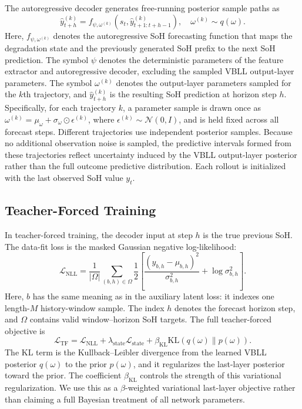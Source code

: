\documentclass[conference]{IEEEtran}
\begin{document}
The autoregressive decoder generates free-running posterior sample paths as
\begin{equation}
\hat{y}_{t+h}^{(k)} =
f_{\psi,\omega^{(k)}}(s_t, \hat{y}_{t+1:t+h-1}^{(k)}), \quad
\omega^{(k)} \sim q(\omega).
\end{equation}
Here, $f_{\psi,\omega^{(k)}}$ denotes the autoregressive SoH forecasting
function that maps the degradation state and the previously generated SoH
prefix to the next SoH prediction. The symbol $\psi$ denotes the deterministic
parameters of the feature extractor and autoregressive decoder, excluding the
sampled VBLL output-layer parameters. The symbol $\omega^{(k)}$ denotes the
output-layer parameters sampled for the $k$th trajectory, and
$\hat y_{t+h}^{(k)}$ is the resulting SoH prediction at horizon step $h$.
Specifically, for each trajectory $k$, a parameter sample is drawn once as
$\omega^{(k)}=\mu_{\omega}+\sigma_{\omega}\odot\epsilon^{(k)}$, where
$\epsilon^{(k)}\sim\mathcal{N}(0,I)$, and is held fixed across all forecast
steps. Different trajectories use independent posterior samples. Because no
additional observation noise is sampled, the predictive intervals formed from
these trajectories reflect uncertainty induced by the VBLL output-layer
posterior rather than the full outcome predictive distribution. Each rollout
is initialized with the last observed SoH value $y_t$.

\subsection{Teacher-Forced Training}

In teacher-forced training, the decoder input at step $h$ is the true previous
SoH. The data-fit loss is the masked Gaussian negative log-likelihood:
\begin{equation}
\mathcal{L}_{\mathrm{NLL}}
=
\frac{1}{|\Omega|}
\sum_{(b,h)\in\Omega}
\frac{1}{2}
\left[
\frac{(y_{b,h}-\mu_{b,h})^2}{\sigma_{b,h}^2}
+ \log \sigma_{b,h}^2
\right].
\end{equation}
Here, $b$ has the same meaning as in the auxiliary latent loss: it indexes one
length-$M$ history-window sample. The index $h$ denotes the forecast horizon
step, and $\Omega$ contains valid window--horizon SoH targets.
The full teacher-forced objective is
\begin{equation}
\mathcal{L}_{\mathrm{TF}}
=
\mathcal{L}_{\mathrm{NLL}}
+ \lambda_{\mathrm{state}}\mathcal{L}_{\mathrm{state}}
+ \beta_{\mathrm{KL}}\mathrm{KL}(q(\omega)\|p(\omega)).
\end{equation}
The KL term is the Kullback--Leibler divergence from the learned VBLL posterior
$q(\omega)$ to the prior $p(\omega)$, and it regularizes the last-layer posterior
toward the prior. The coefficient $\beta_{\mathrm{KL}}$ controls the strength of
this variational regularization.
We use this as a $\beta$-weighted variational last-layer objective rather than
claiming a full Bayesian treatment of all network parameters.
\end{document}
